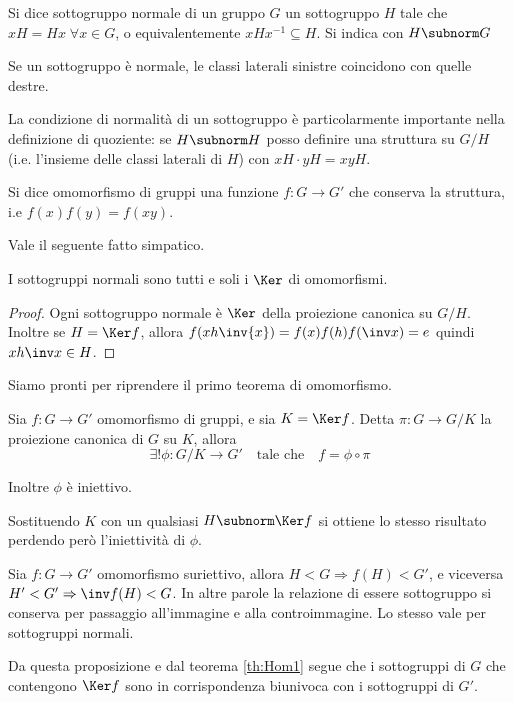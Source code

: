 \documentclass[a4paper,10pt,oneside]{math_article}
\begin{document}
      \begin{mydef}
	Si dice sottogruppo normale di un gruppo $G$ un sottogruppo $H$ tale che $xH=Hx\; \forall x\in G$, o equivalentemente $xHx^{-1}\subseteq H$. Si indica con $H \subnorm G$
      \end{mydef}
      
      Se un sottogruppo è normale, le classi laterali sinistre coincidono con quelle destre.
      
      La condizione di normalità di un sottogruppo è particolarmente importante nella definizione di quoziente: se $H\subnorm H$ posso definire una struttura su $G/H$ (i.e. l'insieme delle classi laterali di $H$) con $xH \cdot yH = xyH$.
      
      \begin{mydef}
	Si dice omomorfismo di gruppi una funzione $f: G \rightarrow G'$ che conserva la struttura, i.e $f(x)f(y)=f(xy)$.
      \end{mydef}
      
      Vale il seguente fatto simpatico.
      
      \begin{myprop}
	I sottogruppi normali sono tutti e soli i $\Ker$ di omomorfismi.
      \end{myprop}
      \begin{proof}
	Ogni sottogruppo normale è $\Ker$ della proiezione canonica su $G/H$. Inoltre se $H = \Ker f$, allora $f(xh\inv{x})= f(x)f(h)f(\inv x)=e$ quindi $xh\inv x\in H$.
      \end{proof}
      
      Siamo pronti per riprendere il primo teorema di omomorfismo.
      \begin{mytheorem}\label{th:Hom1}
	Sia $f: G\rightarrow G'$ omomorfismo di gruppi, e sia $K= \Ker f$. Detta $\pi: G\rightarrow G/K$ la proiezione canonica di $G$ su $K$, allora 
	\[\exists!\phi: G/K \rightarrow G' \quad\mbox{tale che}\quad f=\phi\circ\pi\]
	
	Inoltre $\phi$ è iniettivo.
      \end{mytheorem}
      
      Sostituendo $K$ con un qualsiasi $H\subnorm \Ker f$ si ottiene lo stesso risultato perdendo però l'iniettività di $\phi$.
      
      \begin{myprop}
	Sia $f: G \rightarrow G'$ omomorfismo suriettivo, allora $H<G \Rightarrow f(H)<G'$, e viceversa $H'<G' \Rightarrow \inv f(H)<G$. In altre parole la relazione di essere sottogruppo si conserva per passaggio all'immagine e alla controimmagine. Lo stesso vale per sottogruppi normali.
      \end{myprop}

      Da questa proposizione e dal teorema \ref{th:Hom1} segue che i sottogruppi di $G$ che contengono $\Ker f$ sono in corrispondenza biunivoca con i sottogruppi di $G'$.
      
\end{document}
